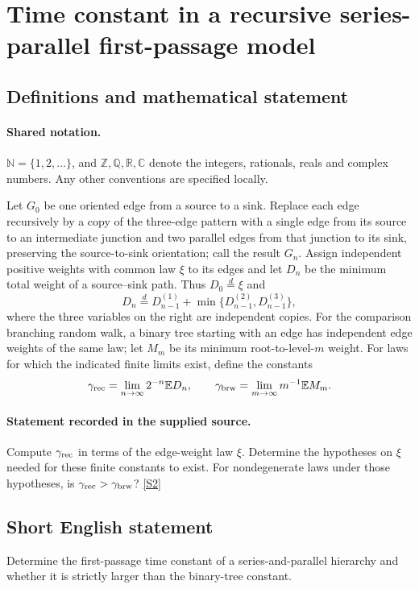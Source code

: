 \documentclass[11pt]{article}
\newcommand{\sref}[2]{\hyperlink{source:#1:#2}{[S#2]}}
\begin{document}
\section{Time constant in a recursive series-parallel first-passage model}\label{statement}

\subsection{Definitions and mathematical statement}

\paragraph{Shared notation.}$\mathbb N=\{1,2,\ldots\}$, and $\mathbb Z,\mathbb Q,\mathbb R,\mathbb C$ denote the integers, rationals, reals and complex numbers. Any other conventions are specified locally.


Let $G_0$ be one oriented edge from a source to a sink. Replace each edge recursively by a copy of the three-edge pattern with a single edge from its source to an intermediate junction and two parallel edges from that junction to its sink, preserving the source-to-sink orientation; call the result $G_n$. Assign independent positive weights with common law $\xi$ to its edges and let $D_n$ be the minimum total weight of a source--sink path. Thus $D_0\stackrel d=\xi$ and
\[D_n\stackrel d=D_{n-1}^{(1)}+\min\{D_{n-1}^{(2)},D_{n-1}^{(3)}\},\]
where the three variables on the right are independent copies. For the comparison branching random walk, a binary tree starting with an edge has independent edge weights of the same law; let $M_m$ be its minimum root-to-level-$m$ weight. For laws for which the indicated finite limits exist, define the constants
\[\gamma_{\rm rec}=\lim_{n\to\infty}2^{-n}\mathbb E D_n,\qquad\gamma_{\rm brw}=\lim_{m\to\infty}m^{-1}\mathbb E M_m.\]
\paragraph{Statement recorded in the supplied source.}
Compute $\gamma_{\rm rec}$ in terms of the edge-weight law $\xi$. Determine the hypotheses on $\xi$ needed for these finite constants to exist. For nondegenerate laws under those hypotheses, is $\gamma_{\rm rec}>\gamma_{\rm brw}$? \sref{statement}{2}
\subsection{Short English statement}
Determine the first-passage time constant of a series-and-parallel hierarchy and whether it is strictly larger than the binary-tree constant.
\end{document}
